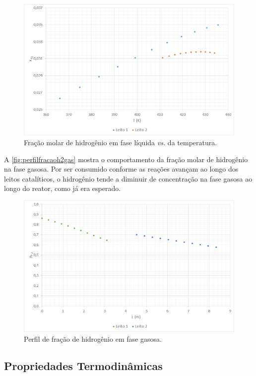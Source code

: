 \begin{figure}[htb]
\centering
\includegraphics[scale=0.4]{images/Chap4/perfilfracaoh2temperatura.png}
\caption{Fração molar de hidrogênio em fase líquida \emph{vs.} da temperatura.}
\label{fig:perfilfracaoh2temperatura}
\end{figure}

A \autoref{fig:perfilfracaoh2gas} mostra o comportamento da
fração molar de hidrogênio na fase gasosa. Por ser consumido conforme as reações
avançam ao longo dos leitos catalíticos, o hidrogênio tende a diminuir de
concentração na fase gasosa ao longo do reator, como já era esperado.

\begin{figure}[htb]
\centering
\includegraphics[scale=0.4]{images/Chap4/perfilfracaoh2gas.png}
\caption{Perfil de fração de hidrogênio em fase gasosa.}
\label{fig:perfilfracaoh2gas}
\end{figure}

\subsection{Propriedades Termodinâmicas} \label{propriedadestermodinâmicas}

